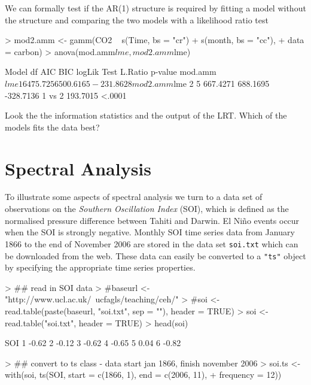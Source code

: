 \documentclass[a4paper,10pt]{article}
\begin{document}
We can formally test if the AR(1) structure is required by fitting a model without the structure and comparing the two models with a likelihood ratio test
\begin{Schunk}
\begin{Sinput}
> mod2.amm <- gamm(CO2 ~ s(Time, bs = "cr") + s(month, bs = "cc"),
+                 data = carbon)
> anova(mod.amm$lme, mod2.amm$lme)
\end{Sinput}
\begin{Soutput}
             Model df      AIC      BIC    logLik   Test  L.Ratio p-value
mod.amm$lme      1  6 475.7256 500.6165 -231.8628                        
mod2.amm$lme     2  5 667.4271 688.1695 -328.7136 1 vs 2 193.7015  <.0001
\end{Soutput}
\end{Schunk}
Look the the information statistics and the output of the LRT. Which of the models fits the data best?

\section{Spectral Analysis}
To illustrate some aspects of spectral analysis we turn to a data set of observations on the \textit{Southern Oscillation Index} (SOI), which is defined as the normalised pressure difference between Tahiti and Darwin. El Ni\~no events occur when the SOI is strongly negative. Monthly SOI time series data from January 1866 to the end of November 2006 are stored in the data set \texttt{soi.txt} which can be downloaded from the web. These data can easily be converted to a \texttt{"ts"} object by specifying the appropriate time series properties.

\begin{Schunk}
\begin{Sinput}
> ## read in SOI data
> #baseurl <- "http://www.ucl.ac.uk/~ucfagls/teaching/ceh/"
> #soi <- read.table(paste(baseurl, "soi.txt", sep = ""), header = TRUE)
> soi <- read.table("soi.txt", header = TRUE)
> head(soi)
\end{Sinput}
\begin{Soutput}
    SOI
1 -0.62
2 -0.12
3 -0.62
4 -0.65
5  0.04
6 -0.82
\end{Soutput}
\begin{Sinput}
> ## convert to ts class - data start jan 1866, finish november 2006
> soi.ts <- with(soi, ts(SOI, start = c(1866, 1), end = c(2006, 11),
+                        frequency = 12))
\end{Sinput}
\end{Schunk}
\end{document}
